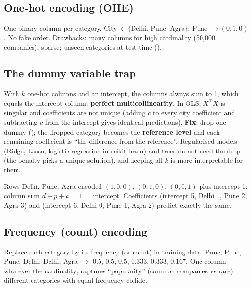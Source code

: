 \subsection{One-hot encoding (OHE)}
One binary column per category. City $\in\{$Delhi, Pune, Agra$\}$: Pune $\to(0,1,0)$. No fake order. Drawbacks: many columns for high cardinality (50{,}000 companies),
sparse; unseen categories at test time ().

\subsection{The dummy variable trap}
With $k$ one-hot columns and an intercept, the columns always sum to 1, which equals the intercept column: \textbf{perfect multicollinearity}. In OLS, $X^\top X$ is singular
and coefficients are not unique (adding $c$ to every city coefficient and subtracting $c$ from the intercept gives identical predictions).
\textbf{Fix}: drop one dummy (); the dropped category becomes the \textbf{reference level} and each remaining coefficient is ``the difference from the
reference''. Regularised models (Ridge, Lasso, logistic regression in scikit-learn) and trees do not need the drop (the penalty picks a unique solution), and keeping all
$k$ is more interpretable for them.
\begin{example}
Rows Delhi, Pune, Agra encoded $(1,0,0)$, $(0,1,0)$, $(0,0,1)$ plus intercept 1: column sum $d + p + a = 1 = $ intercept. Coefficients (intercept 5, Delhi 1, Pune 2, Agra 3)
and (intercept 6, Delhi 0, Pune 1, Agra 2) predict exactly the same.
\end{example}

\subsection{Frequency (count) encoding}
Replace each category by its frequency (or count) in training data. Pune, Pune, Pune, Delhi, Delhi, Agra $\to$ 0.5, 0.5, 0.5, 0.333, 0.333, 0.167. One column whatever the
cardinality; captures ``popularity'' (common companies vs rare); different categories with equal frequency collide.

